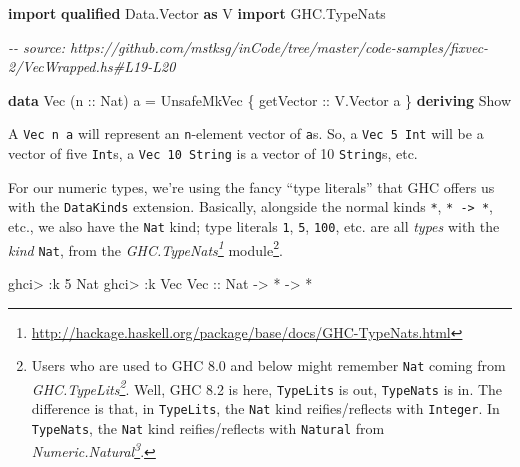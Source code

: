 \documentclass[]{article}
\newenvironment{Shaded}{}{}
\newcommand{\CommentTok}[1]{\textcolor[rgb]{0.38,0.63,0.69}{\textit{#1}}}
\newcommand{\DataTypeTok}[1]{\textcolor[rgb]{0.56,0.13,0.00}{#1}}
\newcommand{\DecValTok}[1]{\textcolor[rgb]{0.25,0.63,0.44}{#1}}
\newcommand{\KeywordTok}[1]{\textcolor[rgb]{0.00,0.44,0.13}{\textbf{#1}}}
\newcommand{\NormalTok}[1]{#1}
\newcommand{\OperatorTok}[1]{\textcolor[rgb]{0.40,0.40,0.40}{#1}}
\newcommand{\OtherTok}[1]{\textcolor[rgb]{0.00,0.44,0.13}{#1}}
\renewcommand{\href}[2]{#2\footnote{\url{#1}}}
\begin{document}
\begin{Shaded}
\begin{Highlighting}[]
\KeywordTok{import} \KeywordTok{qualified} \DataTypeTok{Data.Vector} \KeywordTok{as} \DataTypeTok{V}
\KeywordTok{import}           \DataTypeTok{GHC.TypeNats}

\CommentTok{{-}{-} source: https://github.com/mstksg/inCode/tree/master/code{-}samples/fixvec{-}2/VecWrapped.hs\#L19{-}L20}

\KeywordTok{data} \DataTypeTok{Vec}\NormalTok{ (}\OtherTok{n ::} \DataTypeTok{Nat}\NormalTok{) a }\OtherTok{=} \DataTypeTok{UnsafeMkVec}\NormalTok{ \{}\OtherTok{ getVector ::} \DataTypeTok{V.Vector}\NormalTok{ a \}}
    \KeywordTok{deriving} \DataTypeTok{Show}
\end{Highlighting}
\end{Shaded}

A \texttt{Vec\ n\ a} will represent an \texttt{n}-element vector of \texttt{a}s.
So, a \texttt{Vec\ 5\ Int} will be a vector of five \texttt{Int}s, a
\texttt{Vec\ 10\ String} is a vector of 10 \texttt{String}s, etc.

For our numeric types, we're using the fancy ``type literals'' that GHC offers
us with the \texttt{DataKinds} extension. Basically, alongside the normal kinds
\texttt{*}, \texttt{*\ -\textgreater{}\ *}, etc., we also have the \texttt{Nat}
kind; type literals \texttt{1}, \texttt{5}, \texttt{100}, etc. are all
\emph{types} with the \emph{kind} \texttt{Nat}, from the
\emph{\href{http://hackage.haskell.org/package/base/docs/GHC-TypeNats.html}{GHC.TypeNats}}
module\footnote{Users who are used to GHC 8.0 and below might remember
  \texttt{Nat} coming from
  \emph{\href{http://hackage.haskell.org/package/base/docs/GHC-TypeLits.html}{GHC.TypeLits}}.
  Well, GHC 8.2 is here, \texttt{TypeLits} is out, \texttt{TypeNats} is in. The
  difference is that, in \texttt{TypeLits}, the \texttt{Nat} kind
  reifies/reflects with \texttt{Integer}. In \texttt{TypeNats}, the \texttt{Nat}
  kind reifies/reflects with \texttt{Natural} from
  \emph{\href{http://hackage.haskell.org/package/base/docs/Numeric-Natural.html}{Numeric.Natural}}.}.

\begin{Shaded}
\begin{Highlighting}[]
\NormalTok{ghci}\OperatorTok{\textgreater{}} \OperatorTok{:}\NormalTok{k }\DecValTok{5}
\DataTypeTok{Nat}
\NormalTok{ghci}\OperatorTok{\textgreater{}} \OperatorTok{:}\NormalTok{k }\DataTypeTok{Vec}
\DataTypeTok{Vec}\OtherTok{ ::} \DataTypeTok{Nat} \OtherTok{{-}\textgreater{}} \OperatorTok{*} \OtherTok{{-}\textgreater{}} \OperatorTok{*}
\end{Highlighting}
\end{Shaded}
\end{document}
